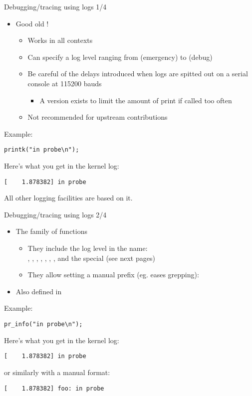 \begin{frame}[fragile]{Debugging/tracing using logs 1/4}
  \begin{itemize}
  \item Good old !
    \begin{itemize}
    \item Works in all contexts
    \item Can specify a log level ranging from  (emergency) to
       (debug)
    \item Be careful of the delays introduced when logs are spitted out on a
      serial console at 115200 bauds
      \begin{itemize}
      \item A  version exists to limit the amount of
        print if called too often
      \end{itemize}
    \item Not recommended for upstream contributions
    \end{itemize}
  \end{itemize}
  Example:
  \begin{verbatim}
printk("in probe\n");
  \end{verbatim}
  Here's what you get in the kernel log:
\begin{verbatim}
[    1.878382] in probe
\end{verbatim}
All other logging facilities are based on it.
\end{frame}

\begin{frame}[fragile]{Debugging/tracing using logs 2/4}
  \begin{itemize}
  \item The  family of functions
    \begin{itemize}
    \item They include the log level in the name:\\
      , , ,
      , , , ,
       and the special  (see next pages)
    \item They allow setting a manual prefix (eg. eases grepping):\\
    \end{itemize}
  \item Also defined in 
  \end{itemize}
  Example:
  \begin{verbatim}
pr_info("in probe\n");
  \end{verbatim}
  Here's what you get in the kernel log:
\begin{verbatim}
[    1.878382] in probe
\end{verbatim}
or similarly with a manual format:
\begin{verbatim}
[    1.878382] foo: in probe
\end{verbatim}
\end{frame}

